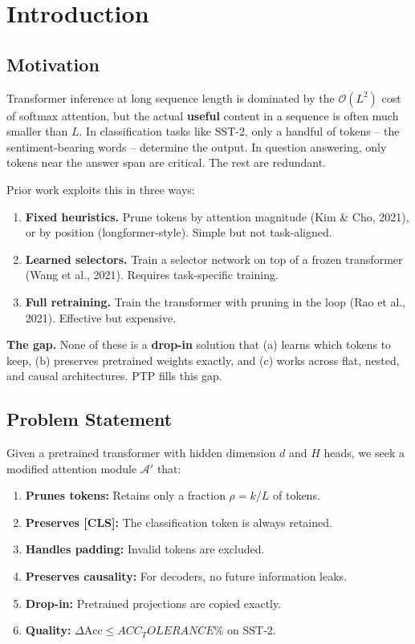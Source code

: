 
\section{Introduction}

\subsection{Motivation}

Transformer inference at long sequence length is dominated by the 
$\mathcal{O}(L^2)$ cost of softmax attention, but the actual \textbf{useful} 
content in a sequence is often much smaller than $L$. In classification 
tasks like SST-2, only a handful of tokens -- the sentiment-bearing words -- 
determine the output. In question answering, only tokens near the answer 
span are critical. The rest are redundant.

Prior work exploits this in three ways:

\begin{enumerate}
\item \textbf{Fixed heuristics.} Prune tokens by attention magnitude (Kim \& Cho,
  2021), or by position (longformer-style). Simple but not task-aligned.

\item \textbf{Learned selectors.} Train a selector network on top of a frozen
  transformer (Wang et al., 2021). Requires task-specific training.

\item \textbf{Full retraining.} Train the transformer with pruning in the loop
  (Rao et al., 2021). Effective but expensive.

\end{enumerate}
\textbf{The gap.} None of these is a \textbf{drop-in} solution that (a) learns which 
tokens to keep, (b) preserves pretrained weights exactly, and (c) works 
across flat, nested, and causal architectures. PTP fills this gap.

\subsection{Problem Statement}

Given a pretrained transformer with hidden dimension $d$ and $H$ heads, we 
seek a modified attention module $\mathcal{A}'$ that:

\begin{enumerate}
\item \textbf{Prunes tokens:} Retains only a fraction $\rho = k/L$ of tokens.
\item \textbf{Preserves [CLS]:} The classification token is always retained.
\item \textbf{Handles padding:} Invalid tokens are excluded.
\item \textbf{Preserves causality:} For decoders, no future information leaks.
\item \textbf{Drop-in:} Pretrained projections are copied exactly.
\item \textbf{Quality:} $\Delta\text{Acc} \leq {{ACC_TOLERANCE}}\%$ on SST-2.

\end{enumerate}
